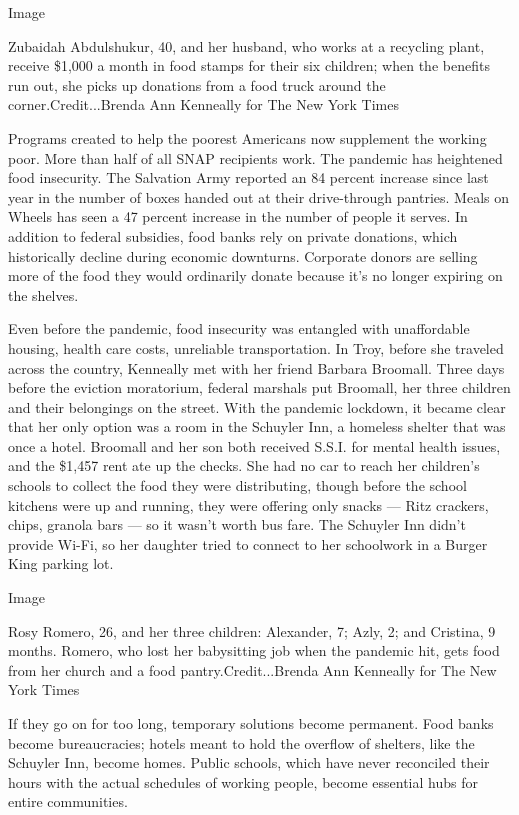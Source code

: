 Image

Zubaidah Abdulshukur, 40, and her husband, who works at a recycling
plant, receive \$1,000 a month in food stamps for their six children;
when the benefits run out, she picks up donations from a food truck
around the corner.Credit...Brenda Ann Kenneally for The New York Times

Programs created to help the poorest Americans now supplement the
working poor. More than half of all SNAP recipients work. The pandemic
has heightened food insecurity. The Salvation Army reported an 84
percent increase since last year in the number of boxes handed out at
their drive-through pantries. Meals on Wheels has seen a 47 percent
increase in the number of people it serves. In addition to federal
subsidies, food banks rely on private donations, which historically
decline during economic downturns. Corporate donors are selling more of
the food they would ordinarily donate because it's no longer expiring on
the shelves.

Even before the pandemic, food insecurity was entangled with
unaffordable housing, health care costs, unreliable transportation. In
Troy, before she traveled across the country, Kenneally met with her
friend Barbara Broomall. Three days before the eviction moratorium,
federal marshals put Broomall, her three children and their belongings
on the street. With the pandemic lockdown, it became clear that her only
option was a room in the Schuyler Inn, a homeless shelter that was once
a hotel. Broomall and her son both received S.S.I. for mental health
issues, and the \$1,457 rent ate up the checks. She had no car to reach
her children's schools to collect the food they were distributing,
though before the school kitchens were up and running, they were
offering only snacks --- Ritz crackers, chips, granola bars --- so it
wasn't worth bus fare. The Schuyler Inn didn't provide Wi-Fi, so her
daughter tried to connect to her schoolwork in a Burger King parking
lot.

Image

Rosy Romero, 26, and her three children: Alexander, 7; Azly, 2; and
Cristina, 9 months. Romero, who lost her babysitting job when the
pandemic hit, gets food from her church and a food
pantry.Credit...Brenda Ann Kenneally for The New York Times

If they go on for too long, temporary solutions become permanent. Food
banks become bureaucracies; hotels meant to hold the overflow of
shelters, like the Schuyler Inn, become homes. Public schools, which
have never reconciled their hours with the actual schedules of working
people, become essential hubs for entire communities.

